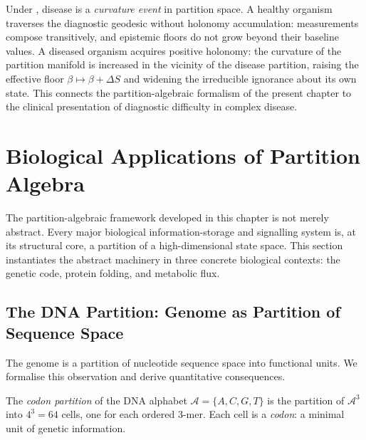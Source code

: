 \begin{remark}
\label{rem:ch02-disease-geometry}
Under , disease is a \emph{curvature event} in
partition space.  A healthy organism traverses the diagnostic geodesic without
holonomy accumulation: measurements compose transitively, and epistemic floors
do not grow beyond their baseline values.  A diseased organism acquires
positive holonomy: the curvature of the partition manifold is increased in the
vicinity of the disease partition, raising the effective floor $\beta
\mapsto \beta + \Delta S$ and widening the irreducible ignorance about its own
state.  This connects the partition-algebraic formalism of the present chapter
to the clinical presentation of diagnostic difficulty in complex disease.
\end{remark}

\section{Biological Applications of Partition Algebra}
\label{sec:ch02-biological-applications}

The partition-algebraic framework developed in this chapter is not merely
abstract.  Every major biological information-storage and signalling system is,
at its structural core, a partition of a high-dimensional state space.  This
section instantiates the abstract machinery in three concrete biological
contexts: the genetic code, protein folding, and metabolic flux.

\subsection{The DNA Partition: Genome as Partition of Sequence Space}

The genome is a partition of nucleotide sequence space into functional units.
We formalise this observation and derive quantitative consequences.

\begin{definition}
\label{def:ch02-codon-partition}
The \emph{codon partition} of the DNA alphabet $\mathcal{A} = \{A, C, G, T\}$
is the partition of $\mathcal{A}^3$ into $4^3 = 64$ cells, one for each ordered
3-mer.  Each cell is a \emph{codon}: a minimal unit of genetic information.
\end{definition}

